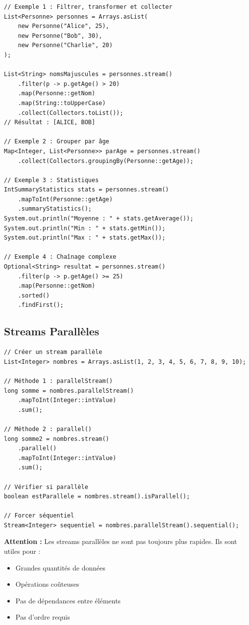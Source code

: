 \documentclass[11pt,a4paper]{article}
\begin{document}
\begin{exemplebox}
\begin{lstlisting}
// Exemple 1 : Filtrer, transformer et collecter
List<Personne> personnes = Arrays.asList(
    new Personne("Alice", 25),
    new Personne("Bob", 30),
    new Personne("Charlie", 20)
);

List<String> nomsMajuscules = personnes.stream()
    .filter(p -> p.getAge() > 20)
    .map(Personne::getNom)
    .map(String::toUpperCase)
    .collect(Collectors.toList());
// Résultat : [ALICE, BOB]

// Exemple 2 : Grouper par âge
Map<Integer, List<Personne>> parAge = personnes.stream()
    .collect(Collectors.groupingBy(Personne::getAge));

// Exemple 3 : Statistiques
IntSummaryStatistics stats = personnes.stream()
    .mapToInt(Personne::getAge)
    .summaryStatistics();
System.out.println("Moyenne : " + stats.getAverage());
System.out.println("Min : " + stats.getMin());
System.out.println("Max : " + stats.getMax());

// Exemple 4 : Chaînage complexe
Optional<String> resultat = personnes.stream()
    .filter(p -> p.getAge() >= 25)
    .map(Personne::getNom)
    .sorted()
    .findFirst();
\end{lstlisting}
\end{exemplebox}

\subsection{Streams Parallèles}

\begin{lstlisting}
// Créer un stream parallèle
List<Integer> nombres = Arrays.asList(1, 2, 3, 4, 5, 6, 7, 8, 9, 10);

// Méthode 1 : parallelStream()
long somme = nombres.parallelStream()
    .mapToInt(Integer::intValue)
    .sum();

// Méthode 2 : parallel()
long somme2 = nombres.stream()
    .parallel()
    .mapToInt(Integer::intValue)
    .sum();

// Vérifier si parallèle
boolean estParallele = nombres.stream().isParallel();

// Forcer séquentiel
Stream<Integer> sequentiel = nombres.parallelStream().sequential();
\end{lstlisting}

\begin{importantbox}
\textbf{Attention :} Les streams parallèles ne sont pas toujours plus rapides. Ils sont utiles pour :
\begin{itemize}
    \item Grandes quantités de données
    \item Opérations coûteuses
    \item Pas de dépendances entre éléments
    \item Pas d'ordre requis
\end{itemize}
\end{importantbox}
\end{document}
